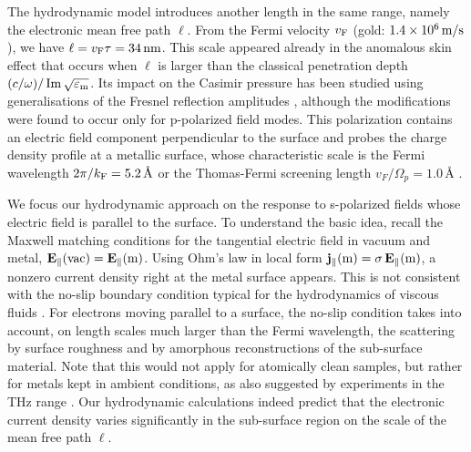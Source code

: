 \documentclass[11pt, oneside]{article}   	%
\newcommand{\bulk}[1]{_{\mathrm{#1}}}
\begin{document}
The hydrodynamic model introduces another length in the same range, namely 
the electronic mean free path $\ell$. 
From the Fermi velocity $v_{\rm F}$ (gold: $1.4 \times 10^{6}\,{\rm m/s}$),
we have $\ell = v_{\rm F} \tau = 34\,{\rm nm}$. This scale
appeared already in the anomalous skin effect 
\citep{DresselGruenerBook}
that occurs when $\ell$ is larger than the classical penetration depth 
$(c/\omega)/ \mathop{\rm Im} \sqrt{\varepsilon\bulk{m}}$.
Its impact on the Casimir pressure has been studied using generalisations of the Fresnel
reflection amplitudes \citep{Esquivel_2003, Svetovoy_2006a}, although the modifications
were found to occur only for p-polarized field modes.
This polarization contains an electric field component perpendicular to the surface 
and probes the charge density profile at a metallic surface, whose
characteristic scale is the Fermi wavelength $2\pi / k_{\rm F} = 5.2\,\text{\AA}$
or the Thomas-Fermi screening length $v_F / \Omega_p = 1.0\,\text{\AA}$
\citep{Feibelman_1982, Wegner_2020}.

We focus our hydrodynamic approach on the response to s-polarized fields whose
electric field is parallel to the surface. 
To understand the basic idea, recall
the Maxwell matching conditions for the tangential electric field in vacuum and metal, 
${\bf E}_\Vert({\rm vac}) = {\bf E}_\Vert({\rm m})$.
Using Ohm's law in local form ${\bf j}_\Vert({\rm m}) = \sigma\,{\bf E}_\Vert({\rm m})$,
a nonzero current density right at the metal surface appears. 
This is not consistent with the 
no-slip boundary condition typical for the hydrodynamics of viscous fluids \citep{landau1987fluid}.
For electrons moving parallel to a surface, the no-slip condition takes into account,
on length scales much larger than the Fermi wavelength, the scattering by surface roughness
and by amorphous reconstructions of the sub-surface material. 
Note that this would not apply for atomically clean samples, but rather for metals
kept in ambient conditions, as also suggested by experiments in the THz range \citep{Laman_2007}.
Our hydrodynamic calculations indeed predict that the electronic current density varies significantly 
in the sub-surface region on the scale of the mean free path $\ell$.
\end{document}
